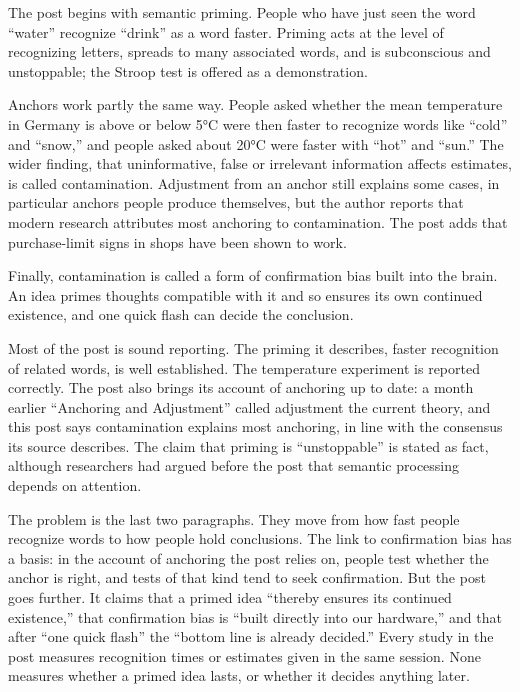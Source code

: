 \begin{afterword}
\summaryhead

The post begins with semantic priming. People who have just seen the word ``water'' recognize ``drink'' as a word faster. Priming acts at the level of recognizing letters, spreads to many associated words, and is subconscious and unstoppable; the Stroop test is offered as a demonstration.

Anchors work partly the same way. People asked whether the mean temperature in Germany is above or below 5°C were then faster to recognize words like ``cold'' and ``snow,'' and people asked about 20°C were faster with ``hot'' and ``sun.'' The wider finding, that uninformative, false or irrelevant information affects estimates, is called contamination. Adjustment from an anchor still explains some cases, in particular anchors people produce themselves, but the author reports that modern research attributes most anchoring to contamination. The post adds that purchase-limit signs in shops have been shown to work.

Finally, contamination is called a form of confirmation bias built into the brain. An idea primes thoughts compatible with it and so ensures its own continued existence, and one quick flash can decide the conclusion.

\responsehead

Most of the post is sound reporting. The priming it describes, faster recognition of related words, is well established. The temperature experiment is reported correctly. The post also brings its account of anchoring up to date: a month earlier ``Anchoring and Adjustment'' called adjustment the current theory, and this post says contamination explains most anchoring, in line with the consensus its source describes. The claim that priming is ``unstoppable'' is stated as fact, although researchers had argued before the post that semantic processing depends on attention.

The problem is the last two paragraphs. They move from how fast people recognize words to how people hold conclusions. The link to confirmation bias has a basis: in the account of anchoring the post relies on, people test whether the anchor is right, and tests of that kind tend to seek confirmation. But the post goes further. It claims that a primed idea ``thereby ensures its continued existence,'' that confirmation bias is ``built directly into our hardware,'' and that after ``one quick flash'' the ``bottom line is already decided.'' Every study in the post measures recognition times or estimates given in the same session. None measures whether a primed idea lasts, or whether it decides anything later.


\end{afterword}
